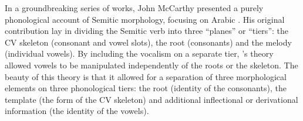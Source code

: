 In a groundbreaking series of works, John McCarthy presented a purely phonological account of Semitic morphology, focusing on Arabic \citep{jjmcc79,jjmcc81,jjmcc89li,jjmccprince90}. His original contribution lay in dividing the Semitic verb into three ``planes'' or ``tiers'': the CV skeleton (consonant and vowel slots), the root (consonants) and the melody (individual vowels).
By including the vocalism on a separate tier, \citeauthor{jjmcc81}'s theory allowed vowels to be manipulated independently of the roots or the skeleton.
The beauty of this theory is that it allowed for a separation of three morphological elements on three phonological tiers: the root (identity of the consonants), the template (the form of the CV skeleton) and additional inflectional or derivational information (the identity of the vowels).

